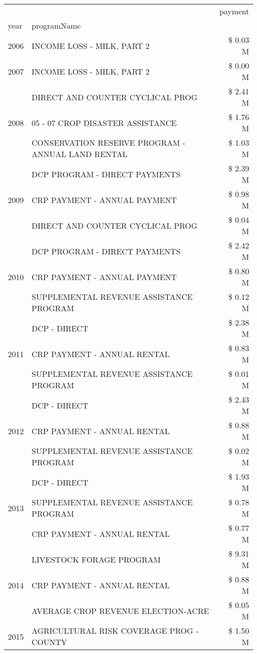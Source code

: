 \begin{tabular}{llr}
\toprule
 &  & payment \\
year & programName &  \\
\midrule
2006 & INCOME LOSS - MILK, PART 2 & \$ 0.03 M \\
\cline{1-3}
2007 & INCOME LOSS - MILK, PART 2 & \$ 0.00 M \\
\cline{1-3}
\multirow[t]{3}{*}{2008} & DIRECT AND COUNTER CYCLICAL PROG & \$ 2.41 M \\
 & 05 - 07 CROP DISASTER ASSISTANCE & \$ 1.76 M \\
 & CONSERVATION RESERVE PROGRAM - ANNUAL LAND RENTAL & \$ 1.03 M \\
\cline{1-3}
\multirow[t]{3}{*}{2009} & DCP PROGRAM - DIRECT PAYMENTS & \$ 2.39 M \\
 & CRP PAYMENT - ANNUAL PAYMENT & \$ 0.98 M \\
 & DIRECT AND COUNTER CYCLICAL PROG & \$ 0.04 M \\
\cline{1-3}
\multirow[t]{3}{*}{2010} & DCP PROGRAM - DIRECT PAYMENTS & \$ 2.42 M \\
 & CRP PAYMENT - ANNUAL PAYMENT & \$ 0.80 M \\
 & SUPPLEMENTAL REVENUE ASSISTANCE PROGRAM & \$ 0.12 M \\
\cline{1-3}
\multirow[t]{3}{*}{2011} & DCP - DIRECT & \$ 2.38 M \\
 & CRP PAYMENT - ANNUAL RENTAL & \$ 0.83 M \\
 & SUPPLEMENTAL REVENUE ASSISTANCE PROGRAM & \$ 0.01 M \\
\cline{1-3}
\multirow[t]{3}{*}{2012} & DCP - DIRECT & \$ 2.43 M \\
 & CRP PAYMENT - ANNUAL RENTAL & \$ 0.88 M \\
 & SUPPLEMENTAL REVENUE ASSISTANCE PROGRAM & \$ 0.02 M \\
\cline{1-3}
\multirow[t]{3}{*}{2013} & DCP - DIRECT & \$ 1.93 M \\
 & SUPPLEMENTAL REVENUE ASSISTANCE PROGRAM & \$ 0.78 M \\
 & CRP PAYMENT - ANNUAL RENTAL & \$ 0.77 M \\
\cline{1-3}
\multirow[t]{3}{*}{2014} & LIVESTOCK FORAGE PROGRAM & \$ 9.31 M \\
 & CRP PAYMENT - ANNUAL RENTAL & \$ 0.88 M \\
 & AVERAGE CROP REVENUE ELECTION-ACRE & \$ 0.05 M \\
\cline{1-3}
\multirow[t]{3}{*}{2015} & AGRICULTURAL RISK COVERAGE PROG - COUNTY & \$ 1.50 M \\

\end{tabular}
